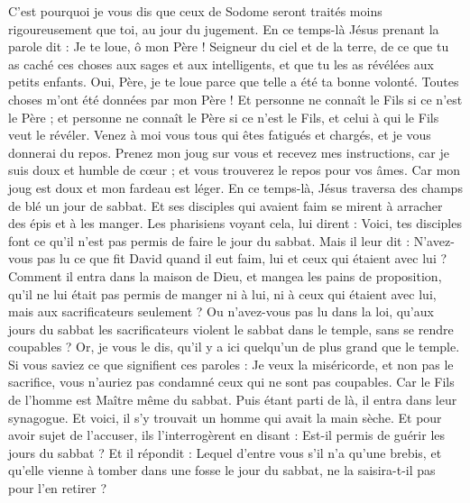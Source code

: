 \begin{multicols}{2}
C'est pourquoi je vous dis que ceux de Sodome seront traités moins rigoureusement que toi, au jour du jugement.
En ce temps-là Jésus prenant la parole dit : Je te loue, ô mon Père ! Seigneur du ciel et de la terre, de ce que tu as caché ces choses aux sages et aux intelligents, et que tu les as révélées aux petits enfants.
Oui, Père, je te loue parce que telle a été ta bonne volonté.
Toutes choses m'ont été données par mon Père ! Et personne ne connaît le Fils si ce n'est le Père ; et personne ne connaît le Père si ce n'est le Fils, et celui à qui le Fils veut le révéler.
Venez à moi vous tous qui êtes fatigués et chargés, et je vous donnerai du repos.
Prenez mon joug sur vous et recevez mes instructions, car je suis doux et humble de cœur ; et vous trouverez le repos pour vos âmes.
Car mon joug est doux et mon fardeau est léger.
\VerseOne{}En ce temps-là, Jésus traversa des champs de blé un jour de sabbat. Et ses disciples qui avaient faim se mirent à arracher des épis et à les manger.
Les pharisiens voyant cela, lui dirent : Voici, tes disciples font ce qu'il n'est pas permis de faire le jour du sabbat.
Mais il leur dit : N'avez-vous pas lu ce que fit David quand il eut faim, lui et ceux qui étaient avec lui ?
Comment il entra dans la maison de Dieu, et mangea les pains de proposition, qu'il ne lui était pas permis de manger ni à lui, ni à ceux qui étaient avec lui, mais aux sacrificateurs seulement ?
Ou n'avez-vous pas lu dans la loi, qu'aux jours du sabbat les sacrificateurs violent le sabbat dans le temple, sans se rendre coupables ?
Or, je vous le dis, qu'il y a ici quelqu'un de plus grand que le temple.
Si vous saviez ce que signifient ces paroles : Je veux la miséricorde, et non pas le sacrifice, vous n'auriez pas condamné ceux qui ne sont pas coupables.
Car le Fils de l'homme est Maître même du sabbat.
Puis étant parti de là, il entra dans leur synagogue.
Et voici, il s'y trouvait un homme qui avait la main sèche. Et pour avoir sujet de l'accuser, ils l'interrogèrent en disant : Est-il permis de guérir les jours du sabbat ?
Et il répondit : Lequel d'entre vous s'il n'a qu'une brebis, et qu'elle vienne à tomber dans une fosse le jour du sabbat, ne la saisira-t-il pas pour l'en retirer ?

\end{multicols}
